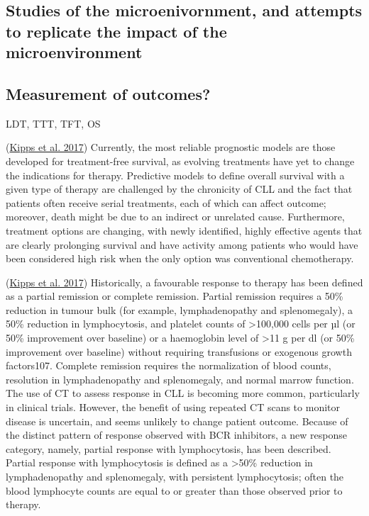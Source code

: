 \documentclass[11pt, a4paper, twosided]{book}
\begin{document}
\hypertarget{studies-of-the-microenivornment-and-attempts-to-replicate-the-impact-of-the-microenvironment}{%
\subsection{Studies of the microenivornment, and attempts to replicate the impact of the microenvironment}\label{studies-of-the-microenivornment-and-attempts-to-replicate-the-impact-of-the-microenvironment}}

\hypertarget{measurement-of-outcomes}{%
\subsection{Measurement of outcomes?}\label{measurement-of-outcomes}}

LDT, TTT, TFT, OS

(\protect\hyperlink{ref-Kipps2017}{Kipps et al. 2017})
Currently, the most reliable prognostic models are those developed for treatment-free survival, as evolving treatments have yet to change the indications for therapy. Predictive models to define overall survival with a given type of therapy are challenged by the chronicity of CLL and the fact that patients often receive serial treatments, each of which can affect outcome; moreover, death might be due to an indirect or unrelated cause. Furthermore, treatment options are changing, with newly identified, highly effective agents that are clearly prolonging survival and have activity among patients who would have been considered high risk when the only option was conventional chemotherapy.

(\protect\hyperlink{ref-Kipps2017}{Kipps et al. 2017})
Historically, a favourable response to therapy has been defined as a partial remission or complete remission. Partial remission requires a 50\% reduction in tumour bulk (for example, lymphadenopathy and splenomegaly), a 50\% reduction in lymphocytosis, and platelet counts of \textgreater100,000 cells per µl (or 50\% improvement over baseline) or a haemoglobin level of \textgreater11 g per dl (or 50\% improvement over baseline) without requiring transfusions or exogenous growth factors107. Complete remission requires the normalization of blood counts, resolution in lymphadenopathy and splenomegaly, and normal marrow function. The use of CT to assess response in CLL is becoming more common, particularly in clinical trials. However, the benefit of using repeated CT scans to monitor disease is uncertain, and seems unlikely to change patient outcome. Because of the distinct pattern of response observed with BCR inhibitors, a new response category, namely, partial response with lymphocytosis, has been described. Partial response with lymphocytosis is defined as a \textgreater50\% reduction in lymphadenopathy and splenomegaly, with persistent lymphocytosis; often the blood lymphocyte counts are equal to or greater than those observed prior to therapy.
\end{document}

